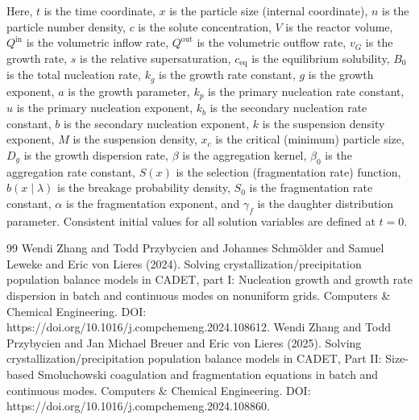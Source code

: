 \documentclass{article}
\begin{document}
Here, $t$ is the time coordinate, $x$ is the particle size (internal coordinate), $n$ is the particle number density, $c$ is the solute concentration, $V$ is the reactor volume, $Q^{\mathrm{in}}$ is the volumetric inflow rate, $Q^{\mathrm{out}}$ is the volumetric outflow rate, $v_{G}$ is the growth rate, $s$ is the relative supersaturation, $c_{\mathrm{eq}}$ is the equilibrium solubility, $B_{0}$ is the total nucleation rate, $k_{g}$ is the growth rate constant, $g$ is the growth exponent, $a$ is the growth parameter, $k_{p}$ is the primary nucleation rate constant, $u$ is the primary nucleation exponent, $k_{b}$ is the secondary nucleation rate constant, $b$ is the secondary nucleation exponent, $k$ is the suspension density exponent, $M$ is the suspension density, $x_{c}$ is the critical (minimum) particle size, $D_{g}$ is the growth dispersion rate, $\beta$ is the aggregation kernel, $\beta_{0}$ is the aggregation rate constant, $S(x)$ is the selection (fragmentation rate) function, $b(x \mid \lambda)$ is the breakage probability density, $S_{0}$ is the fragmentation rate constant, $\alpha$ is the fragmentation exponent, and $\gamma_{f}$ is the daughter distribution parameter.
Consistent initial values for all solution variables are defined at $t = 0$.
\begin{thebibliography}{99}
     Wendi Zhang and Todd Przybycien and Johannes Schmölder and Samuel Leweke and Eric von Lieres (2024). Solving crystallization/precipitation population balance models in CADET, part I: Nucleation growth and growth rate dispersion in batch and continuous modes on nonuniform grids. Computers \& Chemical Engineering. DOI: https://doi.org/10.1016/j.compchemeng.2024.108612.
     Wendi Zhang and Todd Przybycien and Jan Michael Breuer and Eric von Lieres (2025). Solving crystallization/precipitation population balance models in CADET, Part II: Size-based Smoluchowski coagulation and fragmentation equations in batch and continuous modes. Computers \& Chemical Engineering. DOI: https://doi.org/10.1016/j.compchemeng.2024.108860.
\end{thebibliography}
\end{document}
